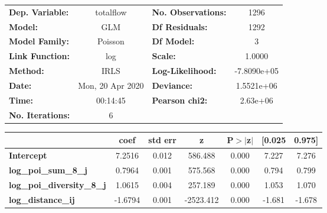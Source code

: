 \begin{center}
\begin{tabular}{lclc}
\toprule
\textbf{Dep. Variable:}            &    totalflow     & \textbf{  No. Observations:  } &      1296    \\
\textbf{Model:}                    &       GLM        & \textbf{  Df Residuals:      } &      1292    \\
\textbf{Model Family:}             &     Poisson      & \textbf{  Df Model:          } &         3    \\
\textbf{Link Function:}            &       log        & \textbf{  Scale:             } &     1.0000   \\
\textbf{Method:}                   &       IRLS       & \textbf{  Log-Likelihood:    } & -7.8090e+05  \\
\textbf{Date:}                     & Mon, 20 Apr 2020 & \textbf{  Deviance:          } &  1.5521e+06  \\
\textbf{Time:}                     &     00:14:45     & \textbf{  Pearson chi2:      } &   2.63e+06   \\
\textbf{No. Iterations:}           &        6         & \textbf{                     } &              \\
\bottomrule
\end{tabular}
\begin{tabular}{lcccccc}
                                   & \textbf{coef} & \textbf{std err} & \textbf{z} & \textbf{P$> |$z$|$} & \textbf{[0.025} & \textbf{0.975]}  \\
\midrule
\textbf{Intercept}                 &       7.2516  &        0.012     &   586.488  &         0.000        &        7.227    &        7.276     \\
\textbf{log\_poi\_sum\_8\_j}       &       0.7964  &        0.001     &   575.568  &         0.000        &        0.794    &        0.799     \\
\textbf{log\_poi\_diversity\_8\_j} &       1.0615  &        0.004     &   257.189  &         0.000        &        1.053    &        1.070     \\
\textbf{log\_distance\_ij}         &      -1.6794  &        0.001     & -2523.412  &         0.000        &       -1.681    &       -1.678     \\
\bottomrule
\end{tabular}
\end{center}